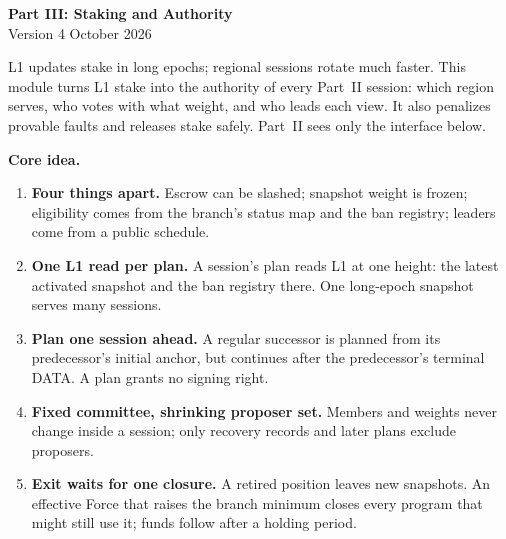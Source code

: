 \documentclass[11pt,a4paper]{article}
\begin{document}
\begin{center}
{\Large\bfseries Part III: Staking and Authority}\\[3pt]
{\small Version 4  October 2026}
\end{center}

L1 updates stake in long epochs; regional sessions rotate much faster.
This module turns L1 stake into the authority of every Part~II session:
which region serves, who votes with what weight, and who leads each view.
It also penalizes provable faults and releases stake safely. Part~II sees
only the interface below.

\begin{mdframed}[linewidth=.6pt,innertopmargin=5pt,innerbottommargin=5pt]
\textbf{Core idea.}
\begin{enumerate}[label=\textbf{\arabic*.},itemsep=2pt]
\item \textbf{Four things apart.} Escrow can be slashed; snapshot weight
is frozen; eligibility comes from the branch's status map and the ban
registry; leaders come from a public schedule.
\item \textbf{One L1 read per plan.} A session's plan reads L1 at one
height: the latest activated snapshot and the ban registry there. One
long-epoch snapshot serves many sessions.
\item \textbf{Plan one session ahead.} A regular successor is planned
from its predecessor's initial anchor, but continues after the
predecessor's terminal DATA. A plan grants no signing right.
\item \textbf{Fixed committee, shrinking proposer set.} Members and
weights never change inside a session; only recovery records and later
plans exclude proposers.
\item \textbf{Exit waits for one closure.} A retired position leaves new
snapshots. An effective Force that raises the branch minimum closes every
program that might still use it; funds follow after a holding period.
\end{enumerate}
\end{mdframed}
\end{document}
